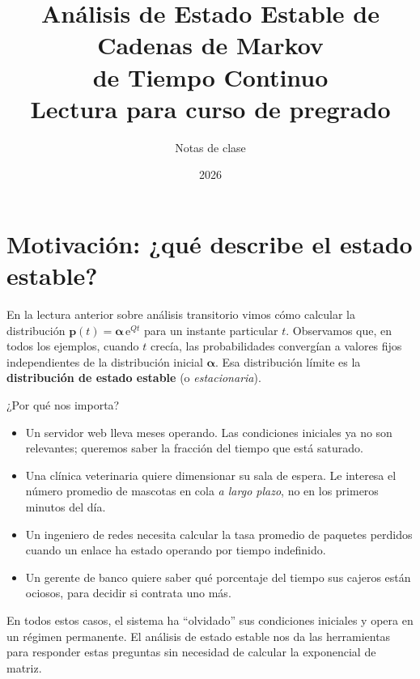 \documentclass[11pt,a4paper]{article}
\title{%
  \textbf{Análisis de Estado Estable de Cadenas de Markov\\
  de Tiempo Continuo}\\[6pt]
  \large Lectura para curso de pregrado
}
\author{Notas de clase}
\date{2026}
\theoremstyle{definition}
\theoremstyle{remark}
\newcommand{\e}{\mathrm{e}}
\begin{document}
\maketitle

\tableofcontents
\newpage

\section{Motivación: ¿qué describe el estado estable?}

En la lectura anterior sobre análisis transitorio vimos cómo calcular la
distribución $\boldsymbol{p}(t) = \boldsymbol{\alpha}\,\e^{Qt}$ para un
instante particular $t$.  Observamos que, en todos los ejemplos, cuando
$t$ crecía, las probabilidades convergían a valores fijos
independientes de la distribución inicial $\boldsymbol{\alpha}$.  Esa
distribución límite es la \textbf{distribución de estado estable}
(o \emph{estacionaria}).

¿Por qué nos importa?

\begin{itemize}[nosep]
  \item Un servidor web lleva meses operando.  Las condiciones iniciales
        ya no son relevantes; queremos saber la fracción del tiempo que
        está saturado.
  \item Una clínica veterinaria quiere dimensionar su sala de espera.
        Le interesa el número promedio de mascotas en cola \emph{a largo
        plazo}, no en los primeros minutos del día.
  \item Un ingeniero de redes necesita calcular la tasa promedio de
        paquetes perdidos cuando un enlace ha estado operando por tiempo
        indefinido.
  \item Un gerente de banco quiere saber qué porcentaje del tiempo sus
        cajeros están ociosos, para decidir si contrata uno más.
\end{itemize}

En todos estos casos, el sistema ha ``olvidado'' sus condiciones
iniciales y opera en un régimen permanente.  El análisis de estado
estable nos da las herramientas para responder estas preguntas sin
necesidad de calcular la exponencial de matriz.

\end{document}
